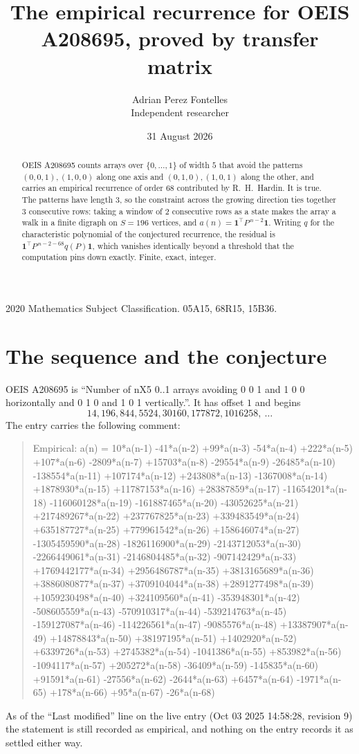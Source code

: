 \documentclass[11pt,a4paper]{article}
\title{The empirical recurrence for OEIS A208695, proved by transfer matrix}
\author{Adrian Perez Fontelles\\ \small Independent researcher}
\date{31 August 2026}
\theoremstyle{plain}
\theoremstyle{definition}
\begin{document}
\maketitle

\begin{abstract}
OEIS A208695 counts arrays over $\{0,\dots,1\}$ of width $5$ that avoid the patterns
$(0,0,1), (1,0,0)$ along one axis and $(0,1,0), (1,0,1)$ along the other, and carries an empirical recurrence of
order $68$ contributed by R.~H.~Hardin. It is true. The patterns have length $3$, so
the constraint across the growing direction ties together $3$ consecutive rows: taking a
window of $2$ consecutive rows as a state makes the array a walk in a finite digraph
on $S=196$ vertices, and $a(n)=\mathbf{1}^{\!\top}P^{\,n-2}\mathbf{1}$. Writing $q$
for the characteristic polynomial of the conjectured recurrence, the residual is
$\mathbf{1}^{\!\top}P^{\,n-2-68}q(P)\mathbf{1}$, which vanishes identically
beyond a threshold that the computation pins down exactly. Finite, exact, integer.
\end{abstract}

\noindent\small 2020 Mathematics Subject Classification. 05A15, 68R15, 15B36.\normalsize

\section{The sequence and the conjecture}

OEIS A208695 is ``Number of nX5 0..1 arrays avoiding 0 0 1 and 1 0 0 horizontally and 0 1 0 and 1 0 1 vertically.''. It has offset
$1$ and begins
\[
14, 196, 844, 5524, 30160, 177872, 1016258,\ \dots
\]
The entry carries the following comment:
\begin{quote}\small
Empirical: a(n) = 10*a(n-1) -41*a(n-2) +99*a(n-3) -54*a(n-4) +222*a(n-5) +107*a(n-6) -2809*a(n-7) +15703*a(n-8) -29554*a(n-9) -26485*a(n-10) -138554*a(n-11) +107174*a(n-12) +243808*a(n-13) -1367008*a(n-14) +1878930*a(n-15) +11787153*a(n-16) +28387859*a(n-17) -11654201*a(n-18) -116060128*a(n-19) -161887465*a(n-20) -43052625*a(n-21) +217489267*a(n-22) +237767825*a(n-23) +339483549*a(n-24) +635187727*a(n-25) +779961542*a(n-26) +158646074*a(n-27) -1305459590*a(n-28) -1826116900*a(n-29) -2143712053*a(n-30) -2266449061*a(n-31) -2146804485*a(n-32) -907142429*a(n-33) +1769442177*a(n-34) +2956486787*a(n-35) +3813165689*a(n-36) +3886080877*a(n-37) +3709104044*a(n-38) +2891277498*a(n-39) +1059230498*a(n-40) +324109560*a(n-41) -353948301*a(n-42) -508605559*a(n-43) -570910317*a(n-44) -539214763*a(n-45) -159127087*a(n-46) -114226561*a(n-47) -9085576*a(n-48) +13387907*a(n-49) +14878843*a(n-50) +38197195*a(n-51) +1402920*a(n-52) +6339726*a(n-53) +2745382*a(n-54) -1041386*a(n-55) +853982*a(n-56) -1094117*a(n-57) +205272*a(n-58) -36409*a(n-59) -145835*a(n-60) +91591*a(n-61) -27556*a(n-62) -2644*a(n-63) +6457*a(n-64) -1971*a(n-65) +178*a(n-66) +95*a(n-67) -26*a(n-68)
\end{quote}
As of the ``Last modified'' line on the live entry (Oct 03 2025 14:58:28, revision
9) the statement is still recorded as empirical, and nothing on the entry
records it as settled either way.
\end{document}
